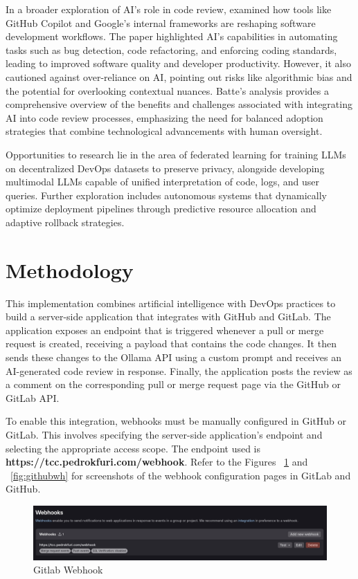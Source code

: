 \documentclass[12pt]{article}
\begin{document}
In a broader exploration of AI's role in code review, \cite{evolvingLandscapeOfCodeReview} examined how tools like GitHub Copilot and Google's internal frameworks are reshaping software development workflows. The paper highlighted AI's capabilities in automating tasks such as bug detection, code refactoring, and enforcing coding standards, leading to improved software quality and developer productivity. However, it also cautioned against over-reliance on AI, pointing out risks like algorithmic bias and the potential for overlooking contextual nuances. Batte's analysis provides a comprehensive overview of the benefits and challenges associated with integrating AI into code review processes, emphasizing the need for balanced adoption strategies that combine technological advancements with human oversight.

Opportunities to research lie in the area of federated learning for training LLMs on decentralized DevOps datasets to preserve privacy, alongside developing multimodal LLMs capable of unified interpretation of code, logs, and user queries. Further exploration includes autonomous systems that dynamically optimize deployment pipelines through predictive resource allocation and adaptive rollback strategies. \cite{aiStreamlinedCICD}

\section{Methodology}
This implementation combines artificial intelligence with DevOps practices to build a server-side application that integrates with GitHub and GitLab. The application exposes an endpoint that is triggered whenever a pull or merge request is created, receiving a payload that contains the code changes. It then sends these changes to the Ollama API using a custom prompt and receives an AI-generated code review in response. Finally, the application posts the review as a comment on the corresponding pull or merge request page via the GitHub or GitLab API.

To enable this integration, webhooks must be manually configured in GitHub or GitLab. This involves specifying the server-side application's endpoint and selecting the appropriate access scope. The endpoint used is \textbf{https://tcc.pedrokfuri.com/webhook}. Refer to the Figures ~\ref{fig:gitlabwh} and ~\ref{fig:githubwh} for screenshots of the webhook configuration pages in GitLab and GitHub.

\begin{figure}[htbp]
    \centering
    \includegraphics[width=1\textwidth]{gitlab-webhook.png}
    \caption{Gitlab Webhook}
    \label{fig:gitlabwh}
\end{figure}
\end{document}
